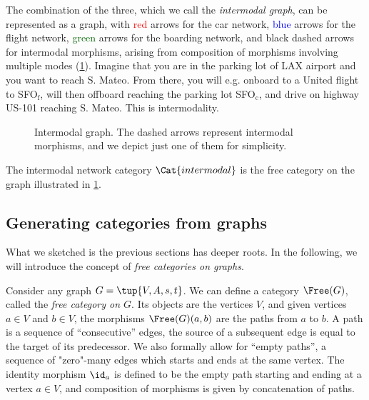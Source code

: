 \begin{example}
The combination of the three, which we call the \emph{intermodal graph}, can be represented as a graph, with \textcolor{red}{red} arrows for the car network, \textcolor{blue}{blue} arrows for the flight network, \textcolor{darkgreen}{green} arrows for the boarding network, and black dashed arrows for intermodal morphisms, arising from composition of morphisms involving multiple modes (\cref{fig:intermodal}). Imagine that you are in the parking lot of \textsf{LAX} airport and you want to reach \textsf{S. Mateo}. From there, you will e.g. onboard to a \textsf{United} flight to \textsf{SFO}$_\mathrm{f}$, will then offboard reaching the parking lot \textsf{SFO}$_\mathrm{c}$, and drive on highway \textsf{US-101} reaching \textsf{S. Mateo}. This is intermodality.

\begin{figure}[h!]
\begin{center}
\end{center}
\caption{Intermodal graph. The dashed arrows represent intermodal morphisms, and we depict just one of them for simplicity. \label{fig:intermodal}
}
\end{figure}
\end{example}

The intermodal network category $\Cat{intermodal}$ is the free category on the graph illustrated in \cref{fig:intermodal}.








\subsection{Generating categories from graphs}
\label{sec:catsfromgraphs}
What we sketched is the previous sections has deeper roots. In the following, we will introduce the concept of \emph{free categories on graphs}.
%
\begin{ctdefinition}
Consider any graph $G=\tup{V,A,s,t}$. We can define a category $\Free(G)$, called the \emph{free category on $G$}. Its objects are the vertices $V$, and given vertices $a\in V$ and $b\in V$, the morphisms $\Free(G)(a,b)$ are the paths from $a$ to $b$.
A path is a sequence of ``consecutive'' edges,  the source of a subsequent edge is equal to the target of its predecessor. We also formally allow for ``empty paths'',  a sequence of "zero"-many edges which starts and ends at the same vertex.
The identity morphism $\id_a$ is defined to be the empty path starting and ending at a vertex $a \in V$, and composition of morphisms is given by concatenation of paths.
\end{ctdefinition}



